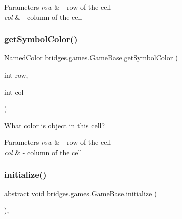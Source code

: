 \begin{DoxyParams}{Parameters}
{\em row} & -\/ row of the cell \\
\hline
{\em col} & -\/ column of the cell \\
\hline
\end{DoxyParams}
\mbox{\label{classbridges_1_1games_1_1_game_base_a8a7782a6d1238ea3cbe26da9c04b2416}} 
\subsubsection{\texorpdfstring{get\+Symbol\+Color()}{getSymbolColor()}}
{\footnotesize\ttfamily \mbox{\hyperlink{enumbridges_1_1base_1_1_named_color}{Named\+Color}} bridges.\+games.\+Game\+Base.\+get\+Symbol\+Color (\begin{DoxyParamCaption}\item[{int}]{row,  }\item[{int}]{col }\end{DoxyParamCaption})\hspace{0.3cm}{\ttfamily [protected]}}



What color is object in this cell? 


\begin{DoxyParams}{Parameters}
{\em row} & -\/ row of the cell \\
\hline
{\em col} & -\/ column of the cell \\
\hline
\end{DoxyParams}
\mbox{\label{classbridges_1_1games_1_1_game_base_a973a52d5eee7c29b01d668fba3c61657}} 
\subsubsection{\texorpdfstring{initialize()}{initialize()}}
{\footnotesize\ttfamily abstract void bridges.\+games.\+Game\+Base.\+initialize (\begin{DoxyParamCaption}{ }\end{DoxyParamCaption})\hspace{0.3cm}{\ttfamily [abstract]}, {\ttfamily [protected]}}




